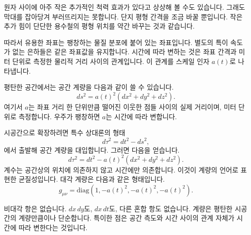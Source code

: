 원자 사이에 아주 작은 추가적인 척력 효과가 있다고 상상해 볼 수도 있습니다. 그래도 막대를 잡아당겨 부러뜨리지는 못합니다. 단지 평형 간격을 조금 바꿀 뿐입니다. 작은 추가 힘이 단단한 용수철의 평형 위치를 약간 바꾸는 것과 같습니다.

\begin{classroomqa}
\end{classroomqa}

따라서 유용한 좌표는 팽창하는 물질 분포에 붙어 있는 좌표입니다. 별도의 특이 속도가 없는 은하들은 같은 좌표값을 유지합니다. 시간에 따라 변하는 것은 좌표 간격과 미터 단위로 측정한 물리적 거리 사이의 관계입니다. 이 관계를 스케일 인자 \(a(t)\)로 나타냅니다.

평탄한 공간에서는 공간 계량을 다음과 같이 쓸 수 있습니다.
\begin{equation}
ds^2 = a(t)^2\left(dx^2+dy^2+dz^2\right).
\end{equation}
여기서 \(a\)는 좌표 거리 한 단위만큼 떨어진 이웃한 점들 사이의 실제 거리이며, 미터 단위로 측정합니다. 우주가 팽창하면 \(a\)는 시간에 따라 변합니다.

시공간으로 확장하려면 특수 상대론의 형태
\begin{equation}
d\tau^2 = dt^2 - ds^2,
\end{equation}
에서 출발해 공간 계량을 대입합니다. 그러면 다음을 얻습니다.
\begin{equation}
d\tau^2 = dt^2 - a(t)^2\left(dx^2+dy^2+dz^2\right).
\end{equation}
계수는 공간상의 위치에 의존하지 않고 시간에만 의존합니다. 이것이 계량의 언어로 표현한 균질성입니다. 대각 계량은 다음과 같은 형태입니다.
\begin{equation}
g_{\mu\nu}=\mathrm{diag}\!\left(1,-a(t)^2,-a(t)^2,-a(t)^2\right).
\end{equation}

비대각 항은 없습니다. \(dx\,dy\)도, \(dx\,dt\)도, 다른 혼합 항도 없습니다. 계량은 평탄한 시공간의 계량만큼이나 단순합니다. 특이한 점은 공간 측도와 시간 사이의 관계 자체가 시간에 따라 변한다는 것입니다.

